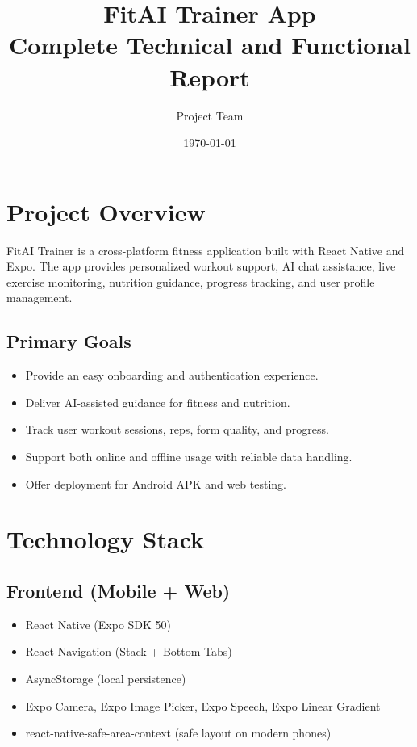 \documentclass[12pt,a4paper]{article}
\title{\textbf{FitAI Trainer App}\\Complete Technical and Functional Report}
\author{Project Team}
\date{\today}
\begin{document}
\maketitle
\tableofcontents
\newpage

\section{Project Overview}
FitAI Trainer is a cross-platform fitness application built with React Native and Expo. The app provides personalized workout support, AI chat assistance, live exercise monitoring, nutrition guidance, progress tracking, and user profile management.

\subsection{Primary Goals}
\begin{itemize}[leftmargin=1.2cm]
  \item Provide an easy onboarding and authentication experience.
  \item Deliver AI-assisted guidance for fitness and nutrition.
  \item Track user workout sessions, reps, form quality, and progress.
  \item Support both online and offline usage with reliable data handling.
  \item Offer deployment for Android APK and web testing.
\end{itemize}

\section{Technology Stack}
\subsection{Frontend (Mobile + Web)}
\begin{itemize}[leftmargin=1.2cm]
  \item React Native (Expo SDK 50)
  \item React Navigation (Stack + Bottom Tabs)
  \item AsyncStorage (local persistence)
  \item Expo Camera, Expo Image Picker, Expo Speech, Expo Linear Gradient
  \item react-native-safe-area-context (safe layout on modern phones)
\end{itemize}
\end{document}

